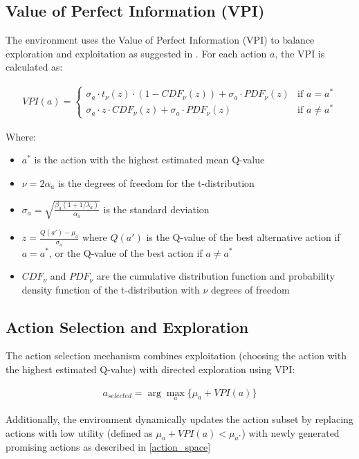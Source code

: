 \subsection{Value of Perfect Information (VPI)}
The environment uses the Value of Perfect Information (VPI) to balance exploration and exploitation as suggested in \cite{matthews2012}. For each action $a$, the VPI is calculated as:

\begin{align}
VPI(a) = \begin{cases}
\sigma_a \cdot t_{\nu}(z) \cdot (1 - CDF_{\nu}(z)) + \sigma_a \cdot PDF_{\nu}(z) & \text{if } a = a^*\\
\sigma_a \cdot z \cdot CDF_{\nu}(z) + \sigma_a \cdot PDF_{\nu}(z) & \text{if } a \neq a^*
\end{cases}
\end{align}

Where:
\begin{itemize}
    \item $a^*$ is the action with the highest estimated mean Q-value
    \item $\nu = 2\alpha_a$ is the degrees of freedom for the t-distribution
    \item $\sigma_a = \sqrt{\frac{\beta_a(1+1/\lambda_a)}{\alpha_a}}$ is the standard deviation
    \item $z = \frac{Q(a') - \mu_a}{\sigma_a}$ where $Q(a')$ is the Q-value of the best alternative action if $a = a^*$, or the Q-value of the best action if $a \neq a^*$
    \item $CDF_{\nu}$ and $PDF_{\nu}$ are the cumulative distribution function and probability density function of the t-distribution with $\nu$ degrees of freedom
\end{itemize}

\subsection{Action Selection and Exploration}

The action selection mechanism combines exploitation (choosing the action with the highest estimated Q-value) with directed exploration using VPI:

\begin{align}
a_{selected} = \arg\max_a \{\mu_a + VPI(a)\}
\end{align}

Additionally, the environment dynamically updates the action subset by replacing actions with low utility (defined as $\mu_a + VPI(a) < \mu_{a^*}$) with newly generated promising actions as described in \ref{action_space}

